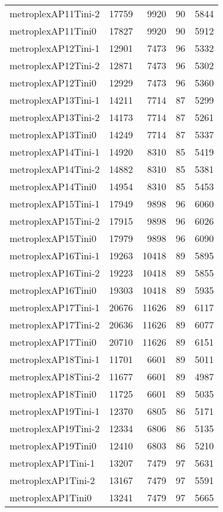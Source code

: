 \begin{longtable}{lrrrr}
metroplexAP11Tini-2 & 17759 & 9920 & 90 & 5844 \\
metroplexAP11Tini0 & 17827 & 9920 & 90 & 5912 \\
metroplexAP12Tini-1 & 12901 & 7473 & 96 & 5332 \\
metroplexAP12Tini-2 & 12871 & 7473 & 96 & 5302 \\
metroplexAP12Tini0 & 12929 & 7473 & 96 & 5360 \\
metroplexAP13Tini-1 & 14211 & 7714 & 87 & 5299 \\
metroplexAP13Tini-2 & 14173 & 7714 & 87 & 5261 \\
metroplexAP13Tini0 & 14249 & 7714 & 87 & 5337 \\
metroplexAP14Tini-1 & 14920 & 8310 & 85 & 5419 \\
metroplexAP14Tini-2 & 14882 & 8310 & 85 & 5381 \\
metroplexAP14Tini0 & 14954 & 8310 & 85 & 5453 \\
metroplexAP15Tini-1 & 17949 & 9898 & 96 & 6060 \\
metroplexAP15Tini-2 & 17915 & 9898 & 96 & 6026 \\
metroplexAP15Tini0 & 17979 & 9898 & 96 & 6090 \\
metroplexAP16Tini-1 & 19263 & 10418 & 89 & 5895 \\
metroplexAP16Tini-2 & 19223 & 10418 & 89 & 5855 \\
metroplexAP16Tini0 & 19303 & 10418 & 89 & 5935 \\
metroplexAP17Tini-1 & 20676 & 11626 & 89 & 6117 \\
metroplexAP17Tini-2 & 20636 & 11626 & 89 & 6077 \\
metroplexAP17Tini0 & 20710 & 11626 & 89 & 6151 \\
metroplexAP18Tini-1 & 11701 & 6601 & 89 & 5011 \\
metroplexAP18Tini-2 & 11677 & 6601 & 89 & 4987 \\
metroplexAP18Tini0 & 11725 & 6601 & 89 & 5035 \\
metroplexAP19Tini-1 & 12370 & 6805 & 86 & 5171 \\
metroplexAP19Tini-2 & 12334 & 6806 & 86 & 5135 \\
metroplexAP19Tini0 & 12410 & 6803 & 86 & 5210 \\
metroplexAP1Tini-1 & 13207 & 7479 & 97 & 5631 \\
metroplexAP1Tini-2 & 13167 & 7479 & 97 & 5591 \\
metroplexAP1Tini0 & 13241 & 7479 & 97 & 5665 \\

\end{longtable}

